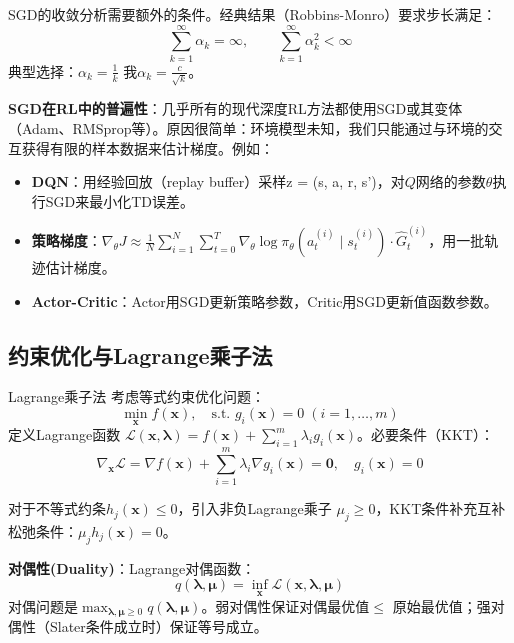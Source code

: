 SGD的收敛分析需要额外的条件。经典结果（Robbins-Monro）要求步长满足：
\[
\sum_{k=1}^{\infty} \alpha_k = \infty, \qquad \sum_{k=1}^{\infty} \alpha_k^2 < \infty
\]
典型选择：$\alpha_k = \frac{1}{k}$ 我$\alpha_k = \frac{c}{\sqrt{k}}$。

\textbf{SGD在RL中的普遍性}：几乎所有的现代深度RL方法都使用SGD或其变体（Adam、RMSprop等）。原因很简单：环境模型未知，我们只能通过与环境的交互获得有限的样本数据来估计梯度。例如：
\begin{itemize}
    \item \textbf{DQN}：用经验回放（replay buffer）采样z = (s, a, r, s')$，对Q网络的参数\theta$执行SGD来最小化TD误差。
    \item \textbf{策略梯度}：$\nabla_\theta J \approx \frac{1}{N} \sum_{i=1}^{N} \sum_{t=0}^{T} \nabla_\theta \log \pi_\theta(a_t^{(i)} \mid s_t^{(i)}) \cdot \hat{G}_t^{(i)}$，用一批轨迹估计梯度。
    \item \textbf{Actor-Critic}：Actor用SGD更新策略参数，Critic用SGD更新值函数参数。
\end{itemize}

\subsection{约束优化与Lagrange乘子法}

\begin{mydefinition}{Lagrange乘子法}
考虑等式约束优化问题：
\[
\min_{\mathbf{x}} f(\mathbf{x}), \quad \text{s.t. } g_i(\mathbf{x}) = 0 \; (i = 1, \dots, m)
\]
定义Lagrange函数 $\mathcal{L}(\mathbf{x}, \boldsymbol{\lambda}) = f(\mathbf{x}) + \sum_{i=1}^{m} \lambda_i g_i(\mathbf{x})$。必要条件（KKT）：
\[
\nabla_{\mathbf{x}} \mathcal{L} = \nabla f(\mathbf{x}) + \sum_{i=1}^{m} \lambda_i \nabla g_i(\mathbf{x}) = \mathbf{0}, \quad g_i(\mathbf{x}) = 0
\]
\end{mydefinition}

对于不等式约条$h_j(\mathbf{x}) \le 0$，引入非负Lagrange乘子 $\mu_j \ge 0$，KKT条件补充互补松弛条件：$\mu_j h_j(\mathbf{x}) = 0$。

\textbf{对偶性(Duality)}：Lagrange对偶函数：
\[
q(\boldsymbol{\lambda}, \boldsymbol{\mu}) = \inf_{\mathbf{x}} \mathcal{L}(\mathbf{x}, \boldsymbol{\lambda}, \boldsymbol{\mu})
\]
对偶问题是$\max_{\boldsymbol{\lambda}, \boldsymbol{\mu} \ge 0} q(\boldsymbol{\lambda}, \boldsymbol{\mu})$。弱对偶性保证对偶最优值$\le$ 原始最优值；强对偶性（Slater条件成立时）保证等号成立。


